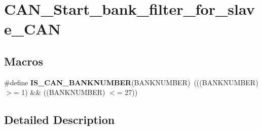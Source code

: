 \hypertarget{group___c_a_n___start__bank__filter__for__slave___c_a_n}{\section{C\-A\-N\-\_\-\-Start\-\_\-bank\-\_\-filter\-\_\-for\-\_\-slave\-\_\-\-C\-A\-N}
\label{group___c_a_n___start__bank__filter__for__slave___c_a_n}
}
\subsection*{Macros}
\begin{DoxyCompactItemize}
\item 
\hypertarget{group___c_a_n___start__bank__filter__for__slave___c_a_n_ga7fb463088ff4cd584bba47e3d0a4f469}{\#define {\bfseries I\-S\-\_\-\-C\-A\-N\-\_\-\-B\-A\-N\-K\-N\-U\-M\-B\-E\-R}(B\-A\-N\-K\-N\-U\-M\-B\-E\-R)~(((B\-A\-N\-K\-N\-U\-M\-B\-E\-R) $>$= 1) \&\& ((B\-A\-N\-K\-N\-U\-M\-B\-E\-R) $<$= 27))}\label{group___c_a_n___start__bank__filter__for__slave___c_a_n_ga7fb463088ff4cd584bba47e3d0a4f469}

\end{DoxyCompactItemize}


\subsection{Detailed Description}
